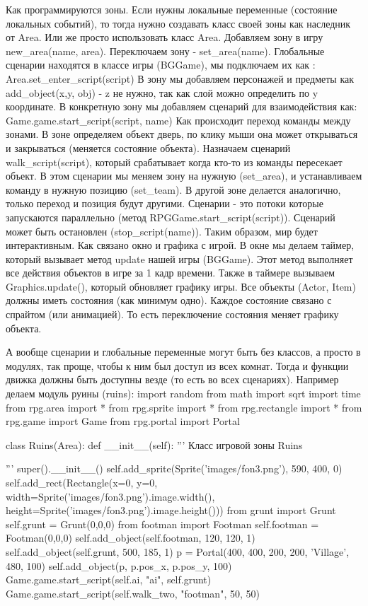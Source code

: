 Как программируются зоны. Если нужны локальные переменные (состояние локальных событий), то тогда нужно создавать класс своей зоны как наследник от Area. Или же просто использовать класс Area. Добавляем зону в игру new\_area(name, area). Переключаем зону - set\_area(name). Глобальные сценарии находятся в классе игры (BGGame), мы подключаем их как :
Area.set\_enter\_script(script)
В зону мы добавляем персонажей и предметы как add\_object(x,y, obj) - z не нужно, так как слой можно определить по y координате.
В конкретную зону мы добавляем сценарий для взаимодействия как: Game.game.start\_script(script, name)
Как происходит переход команды между зонами.
В зоне определяем объект дверь, по клику мыши она может открываться и закрываться (меняется состояние объекта). Назначаем сценарий walk\_script(script), который срабатывает когда кто-то из команды пересекает объект. В этом сценарии мы меняем зону на нужную (set\_area), и устанавливаем команду в нужную позицию (set\_team). В другой зоне делается аналогично, только переход и позиция будут другими.
Сценарии - это потоки которые запускаются параллельно (метод RPGGame.start\_script(script)). Сценарий может быть остановлен (stop\_script(name)).
Таким образом, мир будет интерактивным.
Как связано окно и графика с игрой. В окне мы делаем таймер, который вызывает метод update нашей игры (BGGame). Этот метод выполняет все действия объектов в игре за 1 кадр времени.
Также в таймере вызываем Graphics.update(), который обновляет графику игры.
Все объекты (Actor, Item) должны иметь состояния (как минимум одно). Каждое состояние связано с спрайтом (или анимацией). То есть переключение состояния меняет графику объекта.

А вообще сценарии и глобальные переменные могут быть без классов, а просто в модулях, так проще, чтобы к ним был доступ из всех комнат. Тогда и функции движка должны быть доступны везде (то есть во всех сценариях). Например делаем модуль руины (ruins):
import random
from math import sqrt
import time
from rpg.area import *
from rpg.sprite import *
from rpg.rectangle import *
from rpg.game import Game
from rpg.portal import Portal

class Ruins(Area):
def \_\_init\_\_(self):
'''
Класс игровой зоны Ruins

'''
super().\_\_init\_\_()
self.add\_sprite(Sprite('images/fon3.png'), 590, 400, 0)
self.add\_rect(Rectangle(x=0, y=0, width=Sprite('images/fon3.png').image.width(), height=Sprite('images/fon3.png').image.height()))
from grunt import Grunt
self.grunt = Grunt(0,0,0)
from footman import Footman
self.footman = Footman(0,0,0)
self.add\_object(self.footman, 120, 120, 1)
self.add\_object(self.grunt, 500, 185, 1)
p = Portal(400, 400, 200, 200, 'Village', 480, 100)
self.add\_object(p, p.pos\_x, p.pos\_y, 100)
Game.game.start\_script(self.ai, "ai", self.grunt)
Game.game.start\_script(self.walk\_two, "footman", 50, 50)



